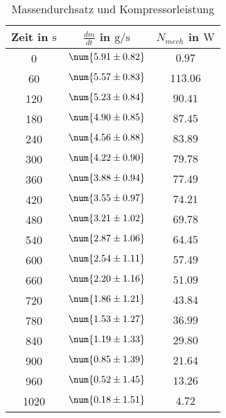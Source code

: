 \begin{table} 
 \centering 
 \begin{tabular}{S S S } 
 \toprule  
{Zeit in $\si{\second}$} & {$\frac{dm}{dt}$ in $\si{\gram \per \second}$} & {$N_{mech}$ in $\si{\watt}$}  \\ 
  & $\num{ 5.91 \pm 0.82 }$ & $\num{ 0.97  }$ \\ 
60  & $\num{ 5.57 \pm 0.83 }$ & $\num{ 113.06  }$ \\ 
120  & $\num{ 5.23 \pm 0.84 }$ & $\num{ 90.41  }$ \\ 
180  & $\num{ 4.90 \pm 0.85 }$ & $\num{ 87.45  }$ \\ 
240  & $\num{ 4.56 \pm 0.88 }$ & $\num{ 83.89  }$ \\ 
300  & $\num{ 4.22 \pm 0.90 }$ & $\num{ 79.78  }$ \\ 
360  & $\num{ 3.88 \pm 0.94 }$ & $\num{ 77.49  }$ \\ 
420  & $\num{ 3.55 \pm 0.97 }$ & $\num{ 74.21  }$ \\ 
480  & $\num{ 3.21 \pm 1.02 }$ & $\num{ 69.78  }$ \\ 
540  & $\num{ 2.87 \pm 1.06 }$ & $\num{ 64.45  }$ \\ 
600  & $\num{ 2.54 \pm 1.11 }$ & $\num{ 57.49  }$ \\ 
660  & $\num{ 2.20 \pm 1.16 }$ & $\num{ 51.09  }$ \\ 
720  & $\num{ 1.86 \pm 1.21 }$ & $\num{ 43.84  }$ \\ 
780  & $\num{ 1.53 \pm 1.27 }$ & $\num{ 36.99  }$ \\ 
840  & $\num{ 1.19 \pm 1.33 }$ & $\num{ 29.80  }$ \\ 
900  & $\num{ 0.85 \pm 1.39 }$ & $\num{ 21.64  }$ \\ 
960  & $\num{ 0.52 \pm 1.45 }$ & $\num{ 13.26  }$ \\ 
1020  & $\num{ 0.18 \pm 1.51 }$ & $\num{ 4.72  }$ \\ 
\bottomrule 
 \end{tabular} 
 \caption{Massendurchsatz und Kompressorleistung} 
 \label{tab: dmdtNmech} 
  \end{table}
